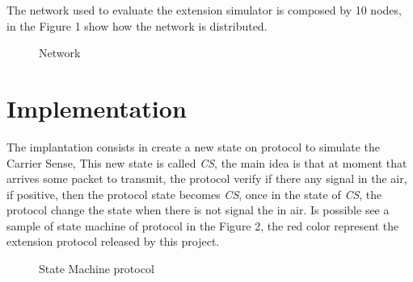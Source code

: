 \documentclass[conference]{IEEEtran}
\begin{document}
 

The network used to evaluate the extension simulator is composed by 10 nodes, in the Figure 1 show how the network is distributed.
\begin{figure}[H]
	\centering
	\caption{Network}
\end{figure}


\section{Implementation}
 
The implantation consists in create a new state on protocol to simulate the Carrier Sense, This new state is called \textit{CS}, the main idea is that at moment that arrives some packet to transmit, the protocol verify if there any signal in the air, if positive, then the protocol state becomes \textit{CS}, once in the state of \textit{CS}, the protocol change the state when there is not signal the in air.
Is possible see a sample of state machine of protocol in the Figure 2, the red color represent the extension protocol released by this project.


\begin{figure}[ht]
		\centering	
		\caption{State Machine protocol}
\end{figure}
\end{document}
